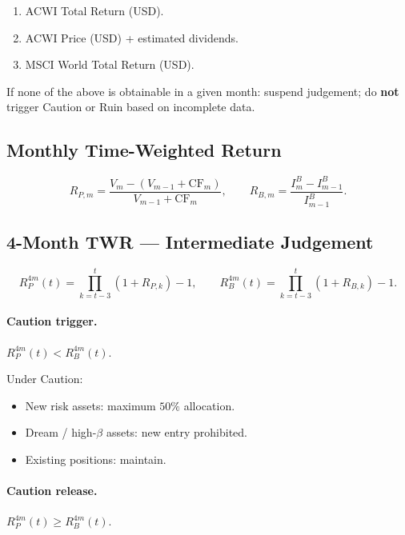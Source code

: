 \begin{enumerate}
\item ACWI Total Return (USD).
\item ACWI Price (USD) + estimated dividends.
\item MSCI World Total Return (USD).
\end{enumerate}

\noindent
If none of the above is obtainable in a given month: suspend
judgement; do \textbf{not} trigger Caution or Ruin based on
incomplete data.

\subsection{Monthly Time-Weighted Return}
\label{sec:invest-monthly-twr}

\begin{equation}
R_{P,m} = \frac{V_m - (V_{m-1} + \mathrm{CF}_m)}{V_{m-1} + \mathrm{CF}_m},
\qquad
R_{B,m} = \frac{I_m^B - I_{m-1}^B}{I_{m-1}^B}.
\end{equation}

\subsection{4-Month TWR --- Intermediate Judgement}
\label{sec:invest-4m-twr}

\begin{equation}
R_P^{4m}(t) = \prod_{k=t-3}^{t} (1 + R_{P,k}) - 1,
\qquad
R_B^{4m}(t) = \prod_{k=t-3}^{t} (1 + R_{B,k}) - 1.
\end{equation}

\paragraph{Caution trigger.}
$R_P^{4m}(t) < R_B^{4m}(t)$.

\noindent
Under Caution:
\begin{itemize}
\item New risk assets: maximum $50\%$ allocation.
\item Dream / high-$\beta$ assets: new entry prohibited.
\item Existing positions: maintain.
\end{itemize}

\paragraph{Caution release.}
$R_P^{4m}(t) \ge R_B^{4m}(t)$.

